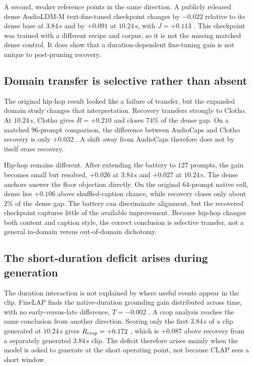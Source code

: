 A second, weaker reference points in the same direction. A publicly released dense AudioLDM-M text-fine-tuned checkpoint changes by $-0.022$  relative to its dense base at $3.84$\,s and by $+0.091$  at $10.24$\,s, with $J=+0.113$ . This checkpoint was trained with a different recipe and corpus, so it is not the missing matched dense control. It does show that a duration-dependent fine-tuning gain is not unique to post-pruning recovery.

\subsection{Domain transfer is selective rather than absent}
The original hip-hop result looked like a failure of transfer, but the expanded domain study changes that interpretation. Recovery transfers strongly to Clotho. At $10.24$\,s, Clotho gives $R=+0.210$  and closes $74\%$ of the dense gap. On a matched $96$-prompt comparison, the difference between AudioCaps and Clotho recovery is only $+0.032$ . A shift away from AudioCaps therefore does not by itself erase recovery.

Hip-hop remains different. After extending the battery to $127$ prompts, the gain becomes small but resolved, $+0.026$  at $3.84$\,s and $+0.027$  at $10.24$\,s. The dense anchors answer the floor objection directly. On the original $64$-prompt native cell, dense lies $+0.106$  above shuffled-caption chance, while recovery closes only about $2\%$ of the dense gap. The battery can discriminate alignment, but the recovered checkpoint captures little of the available improvement. Because hip-hop changes both content and caption style, the correct conclusion is selective transfer, not a general in-domain versus out-of-domain dichotomy.

\subsection{The short-duration deficit arises during generation}
The duration interaction is not explained by where useful events appear in the clip. FineLAP finds the native-duration grounding gain distributed across time, with no early-versus-late difference, $T=-0.002$ . A crop analysis reaches the same conclusion from another direction. Scoring only the first $3.84$\,s of a clip generated at $10.24$\,s gives $R_{\rm crop}=+0.172$ , which is $+0.087$  above recovery from a separately generated $3.84$\,s clip. The deficit therefore arises mainly when the model is asked to generate at the short operating point, not because CLAP sees a short window.

